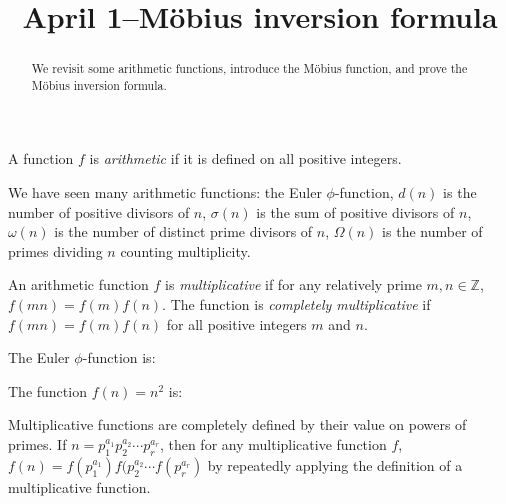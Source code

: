 \documentclass{ximera}
\title{April 1--M\"obius inversion formula}
\begin{document}
  
\begin{abstract}  
We revisit some arithmetic functions, introduce the M\"obius function, and prove the M\"obius inversion formula.\end{abstract}  
\maketitle  

\begin{definition}
 A function $f$ is \emph{arithmetic} if it is defined on all positive integers.
\end{definition}

We have seen many arithmetic functions: the Euler $\phi$-function, $d(n)$ is the number of positive divisors of $n$, $\sigma(n)$ is the sum of positive divisors of $n$, $\omega(n)$ is the number of distinct prime divisors of $n$, $\Omega(n)$ is the number of primes dividing $n$ counting multiplicity.

\begin{definition}
 An arithmetic function $f$ is \emph{multiplicative} if for any relatively prime $m,n\in\mathbb{Z}$, $f(mn)=f(m)f(n)$. The function is \emph{completely multiplicative} if $f(mn)=f(m)f(n)$ for all positive integers $m$  and $n$.
\end{definition}

\begin{question}
The Euler $\phi$-function is:
\begin{multipleChoice}
\end{multipleChoice}

The function $f(n)=n^2$ is: 
\begin{multipleChoice}
\end{multipleChoice}
\end{question}

Multiplicative functions are completely defined by their value on powers of primes. If $n=p_1^{a_1}p_2^{a_2}\cdots p_r^{a_r}$, then for any multiplicative function $f$, $f(n)=f(p_1^{a_1})f(p_2^{a_2}\cdots f(p_r^{a_r})$ by repeatedly applying the definition of a multiplicative function.
\end{document}
